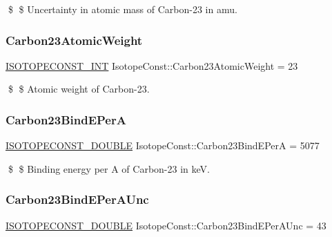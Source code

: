 \$ \$ Uncertainty in atomic mass of Carbon-\/23 in amu. \mbox{\label{group___isotope_const-_carbon-_c23_gabd9f01e60ef633cab5ebed22fea8d2d7}} 
\subsubsection{\texorpdfstring{Carbon23\+Atomic\+Weight}{Carbon23AtomicWeight}}
{\footnotesize\ttfamily \mbox{\hyperlink{group___isotope_const-_macros_ga5f18360b3e99483a35c32d789e62621c}{I\+S\+O\+T\+O\+P\+E\+C\+O\+N\+S\+T\+\_\+\+I\+NT}} Isotope\+Const\+::\+Carbon23\+Atomic\+Weight = 23}

\$ \$ Atomic weight of Carbon-\/23. \mbox{\label{group___isotope_const-_carbon-_c23_ga5793313a58724cd1e460816d0b289b0d}} 
\subsubsection{\texorpdfstring{Carbon23\+Bind\+E\+PerA}{Carbon23BindEPerA}}
{\footnotesize\ttfamily \mbox{\hyperlink{group___isotope_const-_macros_ga8f45a7272ce02c0b4c65c44636ed719a}{I\+S\+O\+T\+O\+P\+E\+C\+O\+N\+S\+T\+\_\+\+D\+O\+U\+B\+LE}} Isotope\+Const\+::\+Carbon23\+Bind\+E\+PerA = 5077}

\$ \$ Binding energy per A of Carbon-\/23 in keV. \mbox{\label{group___isotope_const-_carbon-_c23_ga4c4584821850e8ae1358cf9ea7de18d3}} 
\subsubsection{\texorpdfstring{Carbon23\+Bind\+E\+Per\+A\+Unc}{Carbon23BindEPerAUnc}}
{\footnotesize\ttfamily \mbox{\hyperlink{group___isotope_const-_macros_ga8f45a7272ce02c0b4c65c44636ed719a}{I\+S\+O\+T\+O\+P\+E\+C\+O\+N\+S\+T\+\_\+\+D\+O\+U\+B\+LE}} Isotope\+Const\+::\+Carbon23\+Bind\+E\+Per\+A\+Unc = 43}

